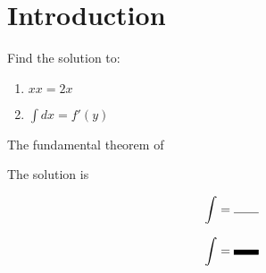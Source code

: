 \documentclass{lecturenotes}
\begin{document}
\section{Introduction}
\begin{example}
Find the solution to: 
\begin{enumerate}
    \item $xx = 2x$
    \item $\int dx = f'(y)$
\end{enumerate}
\end{example}



\begin{theorem}
The fundamental theorem of 
\end{theorem}


The solution is \bl\bl

\begin{align*}
\int = \bl 
\end{align*}

\begin{align*}
\int = \rule{2em}{0.4em} 
\end{align*}
\end{document}
